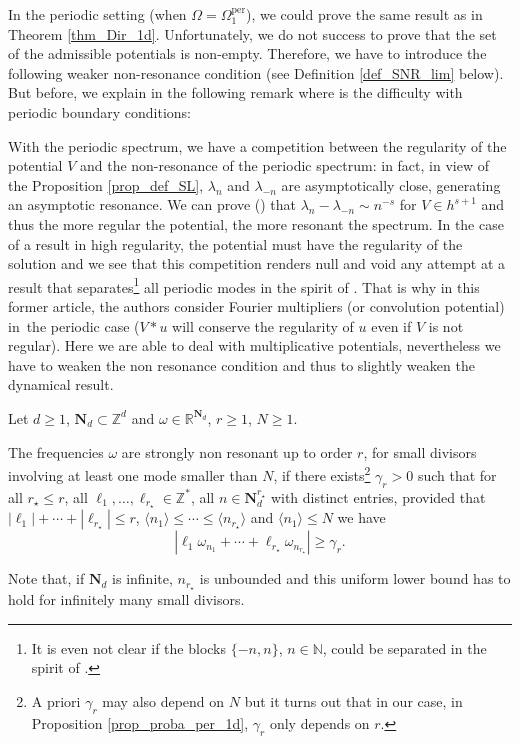 In the periodic setting (\ie when $\Omega= \Omega_1^{\mathrm{per}}$), we could prove the same result as in Theorem \ref{thm_Dir_1d}. Unfortunately, we do not success to prove that the set of the admissible potentials is non-empty. Therefore, we have to introduce the following weaker non-resonance condition (see Definition \ref{def_SNR_lim} below). But before,
we explain in the following remark where is the difficulty with periodic boundary conditions:
\begin{remark}\label{rk:per}
With the periodic spectrum, we have a competition between the regularity of the potential $V$ and the non-resonance of the periodic spectrum: in fact, in view of the Proposition \ref{prop_def_SL}, $\lambda_n$ and $\lambda_{-n}$ are asymptotically close, generating an asymptotic resonance. We can prove (\cf \cite{Mar86}) that $\lambda_n\!-\!\lambda_{-n}\!\sim\! n^{-s}$ for \hbox{$V\!\in\! h^{s+1}$} and thus the more regular the potential, the more resonant the spectrum. In the case of a result in high regularity, the potential must have the regularity of the solution and we see that this competition renders null and void any attempt at a result that separates\footnote{It is even not clear if the blocks $\{-n,n\}$, $n\in \mathbb{N}$, could be separated in the spirit of \cite{BDGS07}.} all periodic modes in the spirit of \cite{BG06}. That is why in this former article, the authors consider Fourier multipliers (or convolution potential) in~the peri\-odic case ($V*u$ will conserve the regularity of $u$ even if $V$ is not regular). Here we are able to deal with multiplicative potentials, nevertheless we have to weaken the non resonance condition and thus to slightly weaken the dynamical result.
\end{remark}
\begin{definition} \label{def_SNR_lim} Let $d\!\geq\! 1$, $\mathbf{N}_d \!\subset\! \mathbb{Z}^d$ and $\omega \!\in\! \mathbb{R}^{\mathbf{N}_d}$, $r\geq 1$, $N \geq 1$.

The frequencies $\omega$ are strongly non resonant up to order $r$, for small divisors involving at least one mode smaller than $N$, if there exists\footnote{A priori $\gamma_r$ may also depend on $N$ but it turns out that in our case, \ie in Proposition \ref{prop_proba_per_1d}, $\gamma_r$ only depends on $r$.} $\gamma_r>0$ such that for all $r_\star \leq r$, all $\ell_1,\dots,\ell_{r_\star} \in \mathbb{Z}^*$, all $n\in \mathbf{N}_d^{r_\star}$ with distinct entries, provided that $|\ell_1|+\cdots+|\ell_{r_\star}| \leq r$, $\langle n_1 \rangle \leq \cdots \leq \langle n_{r_\star} \rangle$ and $\langle n_1 \rangle\leq N$ we have
\[
|\ell_1 \omega_{n_1} + \cdots + \ell_{r_\star} \omega_{n_{r_\star}} | \geq \gamma_r.
\]
\end{definition}
\begin{remark}
Note that, if $\mathbf{N}_d$ is infinite, $n_{r_\star}$ is unbounded and this uniform lower bound has to hold for infinitely many small divisors.
\end{remark}

